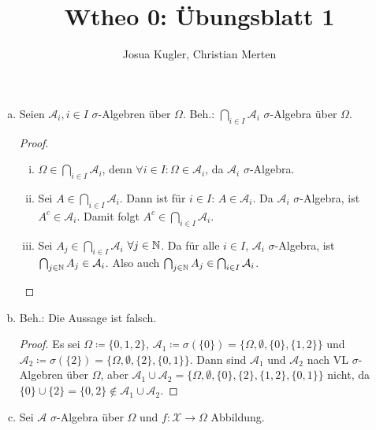\documentclass[uebung]{lecture}
\title{Wtheo 0: Übungsblatt 1}
\author{Josua Kugler, Christian Merten}
\begin{document}
\punkte

\begin{aufgabe}
    \begin{enumerate}[(a)]
        \item Seien $\mathcal{A}_i, i \in I$ $\sigma$-Algebren über $\Omega$.
            Beh.: $\bigcap_{i \in  I} \mathcal{A}_i$ $\sigma$-Algebra über $\Omega$.
            \begin{proof}
                \begin{enumerate}[(i)]
                    \item $\Omega \in \bigcap_{i \in  I} \mathcal{A}_i$, denn
                        $\forall i \in I\colon \Omega \in \mathcal{A}_i$, da $\mathcal{A}_i$ $\sigma$-Algebra.
                    \item Sei $A \in \bigcap_{i \in  I} \mathcal{A}_i$. Dann ist für $i \in I$:
                        $A \in \mathcal{A}_i$. Da $\mathcal{A}_i$ $\sigma$-Algebra,
                        ist $A^{c} \in \mathcal{A}_i$. Damit folgt
                        $A^{c} \in \bigcap_{i \in  I} \mathcal{A}_i$.
                    \item Sei $A_j \in \bigcap_{i \in  I} \mathcal{A}_i$ $\forall j \in \mathbb{N}$. Da
                        für alle $i \in I$, $\mathcal{A}_i$ $\sigma$-Algebra, ist
                        $\bigcap_{j \in  \mathbb{N}} A_j \in \mathcal{A}_i$. Also auch
                        $\bigcap_{j \in \mathbb{N}} A_j \in \bigcap_{i \in I} \mathcal{A}_i$.
                \end{enumerate}
            \end{proof}
        \item Beh.: Die Aussage ist falsch.
            \begin{proof}
                Es sei $\Omega \coloneqq \{ 0, 1, 2\} $,
                $\mathcal{A}_1 \coloneqq \sigma(\{0\}) = \{ \Omega, \emptyset, \{0\} , \{1, 2\} \} $ und \\
                $\mathcal{A}_2 \coloneqq \sigma(\{2\} ) = \{\Omega, \emptyset, \{2\}, \{0, 1\} \} $.
                Dann sind $\mathcal{A}_1$ und $\mathcal{A}_2$ nach VL $\sigma$-Algebren über $\Omega$, aber
                $\mathcal{A}_1 \cup \mathcal{A}_2 = \{\Omega, \emptyset, \{0\} , \{2\} , \{1,2\} , \{0,1\} \} $
                nicht, da $\{0\}  \cup \{2\} = \{0, 2\} \not\in \mathcal{A}_1 \cup \mathcal{A}_2$.
            \end{proof}
        \item Sei $\mathcal{A}$ $\sigma$-Algebra über $\Omega$ und $f\colon \mathcal{X} \to \Omega$ Abbildung.

\end{enumerate}
\end{aufgabe}
\end{document}
